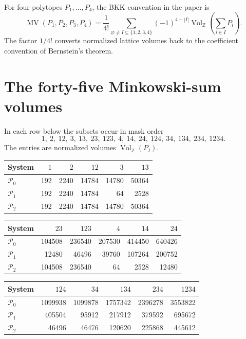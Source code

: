 \documentclass[11pt]{article}
\newcommand{\VolZ}{\operatorname{Vol}_{\mathbb Z}}
\newcommand{\MV}{\operatorname{MV}}
\begin{document}
For four polytopes $P_1,\ldots,P_4$, the BKK convention in the paper is
\begin{equation}\label{eq:polarization}
 \MV(P_1,P_2,P_3,P_4)=\frac1{4!}
 \sum_{\varnothing\ne I\subseteq\{1,2,3,4\}}
 (-1)^{4-|I|}\VolZ\left(\sum_{i\in I}P_i\right).
\end{equation}
The factor $1/4!$ converts normalized lattice volumes back to the coefficient convention of Bernstein's theorem.

\section{The forty-five Minkowski-sum volumes}

In each row below the subsets occur in mask order
\[
 1,\ 2,\ 12,\ 3,\ 13,\ 23,\ 123,\
 4,\ 14,\ 24,\ 124,\ 34,\ 134,\ 234,\ 1234.
\]
The entries are normalized volumes $\VolZ(P_I)$.

\begin{center}
\small
\begin{tabular}{@{}lrrrrr@{}}
\toprule
System & $1$ & $2$ & $12$ & $3$ & $13$\\
\midrule
$\mathcal P_0$ & 192 & 2240 & 14784 & 14780 & 50364\\
$\mathcal P_1$ & 192 & 2240 & 14784 & 64 & 2528\\
$\mathcal P_2$ & 192 & 2240 & 14784 & 14780 & 50364\\
\bottomrule
\end{tabular}

\medskip
\begin{tabular}{@{}lrrrrr@{}}
\toprule
System & $23$ & $123$ & $4$ & $14$ & $24$\\
\midrule
$\mathcal P_0$ & 104508 & 236540 & 207530 & 414450 & 640426\\
$\mathcal P_1$ & 12480 & 46496 & 39760 & 107264 & 200752\\
$\mathcal P_2$ & 104508 & 236540 & 64 & 2528 & 12480\\
\bottomrule
\end{tabular}

\medskip
\begin{tabular}{@{}lrrrrr@{}}
\toprule
System & $124$ & $34$ & $134$ & $234$ & $1234$\\
\midrule
$\mathcal P_0$ & 1099938 & 1099878 & 1757342 & 2396278 & 3553822\\
$\mathcal P_1$ & 405504 & 95912 & 217912 & 379592 & 695672\\
$\mathcal P_2$ & 46496 & 46476 & 120620 & 225868 & 445612\\
\bottomrule
\end{tabular}
\end{center}
\end{document}
